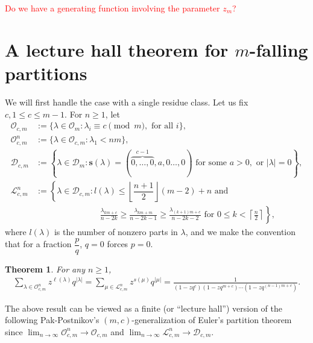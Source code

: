 \documentclass[11pt,reqno]{amsart}
\numberwithin{equation}{section}
\def\red{\textcolor{red}}
\theoremstyle{plain}
\newtheorem{theorem}{Theorem}[section]
\theoremstyle{definition}
\newcommand{\D}{\mathcal{D}}
\newcommand{\OO}{\mathcal{O}}
\newcommand{\sbf}{\mathbf{s}}
\newcommand{\LL}{\mathcal{L}}
\begin{document}
\red{Do we have a generating function involving the parameter $z_m$?}
\fi

















\section{A lecture hall theorem for \texorpdfstring{$m$-falling}{} partitions}\label{sec3: m-falling}




We will first handle the case with a single residue class. Let us fix $c, 1\le c \le m-1$. For $n\ge 1$, let
\begin{align*}
\OO_{c,m}&:=\{\lambda\in\OO_m:\lambda_i\equiv c\pmod{m}, \text{ for all $i$}\},\\
\OO_{c,m}^n&:=\{\lambda\in\OO_{c,m}:\lambda_1<nm\},\\
\D_{c,m}&:=\left\{\lambda\in\D_m:\sbf(\lambda)=(\overbrace{0,\ldots,0}^{c-1},a,0\ldots,0) \text{ for some }a> 0, \text{ or }|\lambda|=0 \right\},\\


\LL_{c,m}^n&:=\left\{\lambda\in\D_{c,m}: l(\lambda)\le \left\lfloor\dfrac{n+1}{2}\right\rfloor (m-2) +n \text{ and} \right.\\
&\phantom{:=}\left.
\qquad \qquad \qquad \frac{\lambda_{km+c}}{n-2k}\ge\frac{\lambda_{km+m}}{n-2k-1} \ge\frac{\lambda_{(k+1)m+c}}{n-2k-2} \text{ for } 0\le k<\left\lceil\frac{n}{2}\right\rceil\right\},
\end{align*}
where $l(\lambda)$ is the number of nonzero parts in $\lambda$, and we make the convention that for a fraction $\dfrac{p}{q}$, $q=0$ forces $p=0$. 



\begin{theorem}\label{thm: mc-lecture hall}
For any $n\ge 1$,
\begin{align}\label{id: mc-lechall}
\sum_{\lambda\in\OO_{c,m}^{n}}z^{\ell(\lambda)}q^{|\lambda|}=\sum_{\mu\in\LL_{c,m}^{n}}z^{s(\mu)}q^{|\mu|}=\frac{1}{(1-zq^c)(1-zq^{m+c})\cdots(1-zq^{(n-1)m+c})}.
\end{align}
\end{theorem}

The above result can be viewed as a finite (or ``lecture hall'') version of the following Pak-Postnikov's $(m,c)$-generalization \cite[Theorem~1]{PP} of Euler's partition theorem since $\lim_{n\to \infty} \OO_{c,m}^n\to \OO_{c,m}$ and $\lim_{n\to \infty} \LL_{c,m}^n \to \D_{c,m}$.
\end{document}
